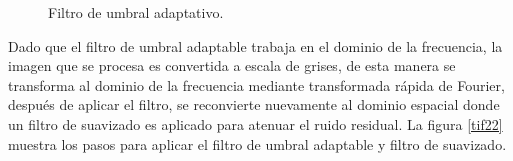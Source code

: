\documentclass[10pt,letterpaper]{article}
\begin{document}
\begin{figure}[H]
      \begin{center}
        \caption{Filtro de umbral adaptativo.}
        \label{tif171819}
      \end{center}
\end{figure}

Dado que el filtro de umbral adaptable trabaja en el dominio de la frecuencia, la imagen que se procesa es convertida a escala de grises, de esta manera se transforma al dominio de la frecuencia mediante transformada rápida de Fourier, después de aplicar el filtro, se reconvierte nuevamente al dominio espacial donde un filtro de suavizado es aplicado para atenuar el ruido residual. La figura \ref{tif22} muestra los pasos para aplicar el filtro de umbral adaptable y filtro de suavizado.
\end{document}
